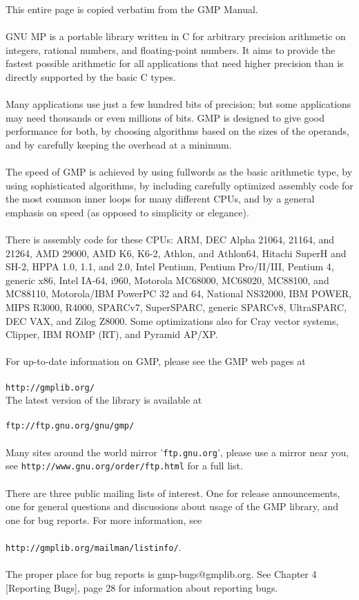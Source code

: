 \documentclass[pdftex,10pt]{article}
\begin{document}
This entire page is copied verbatim from the GMP Manual.\\
\\
GNU MP is a portable library written in C for arbitrary precision arithmetic on
integers, rational numbers, and floating-point numbers. It aims to provide the
fastest possible arithmetic for all applications that need higher precision
than is directly supported by the basic C types.\\
\\
Many applications use just a few hundred bits of precision; but some
applications may need thousands or even millions of bits. GMP is designed to
give good performance for both, by choosing algorithms based on the sizes of
the operands, and by carefully keeping the overhead at a minimum.\\
\\
The speed of GMP is achieved by using fullwords as the basic arithmetic type,
by using sophisticated algorithms, by including carefully optimized assembly
code for the most common inner loops for many different CPUs, and by a general
emphasis on speed (as opposed to simplicity or elegance).\\
\\
There is assembly code for these CPUs: ARM, DEC Alpha 21064, 21164, and 21264,
AMD 29000, AMD K6, K6-2, Athlon, and Athlon64, Hitachi SuperH and SH-2, HPPA
1.0, 1.1, and 2.0, Intel Pentium, Pentium Pro/II/III, Pentium 4, generic x86,
Intel IA-64, i960, Motorola MC68000, MC68020, MC88100, and MC88110,
Motorola/IBM PowerPC 32 and 64, National NS32000, IBM POWER, MIPS R3000, R4000,
SPARCv7, SuperSPARC, generic SPARCv8, UltraSPARC, DEC VAX, and Zilog Z8000.
Some optimizations also for Cray vector systems, Clipper, IBM ROMP (RT), and
Pyramid AP/XP.\\
\\
For up-to-date information on GMP, please see the GMP web pages at\\
\\
\hangindent=0.5cm \texttt{http://gmplib.org/}\\

The latest version of the library is available at\\
\\
\texttt{ftp://ftp.gnu.org/gnu/gmp/}\\
\\
Many sites around the world mirror '\texttt{ftp.gnu.org}', please use a mirror
near you, see \texttt{http://www.gnu.org/order/ftp.html} for a full list.\\
\\
There are three public mailing lists of interest. One for release
announcements, one for general questions and discussions about usage of the GMP
library, and one for bug reports. For more information, see\\
\\
\texttt{http://gmplib.org/mailman/listinfo/}.\\
\\
The proper place for bug reports is gmp-bugs@gmplib.org. See Chapter 4
[Reporting Bugs], page 28 for information about reporting bugs.
\end{document}
